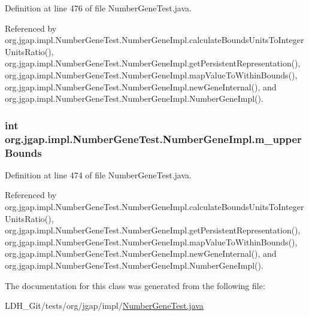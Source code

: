 Definition at line 476 of file Number\-Gene\-Test.\-java.



Referenced by org.\-jgap.\-impl.\-Number\-Gene\-Test.\-Number\-Gene\-Impl.\-calculate\-Bounds\-Units\-To\-Integer\-Units\-Ratio(), org.\-jgap.\-impl.\-Number\-Gene\-Test.\-Number\-Gene\-Impl.\-get\-Persistent\-Representation(), org.\-jgap.\-impl.\-Number\-Gene\-Test.\-Number\-Gene\-Impl.\-map\-Value\-To\-Within\-Bounds(), org.\-jgap.\-impl.\-Number\-Gene\-Test.\-Number\-Gene\-Impl.\-new\-Gene\-Internal(), and org.\-jgap.\-impl.\-Number\-Gene\-Test.\-Number\-Gene\-Impl.\-Number\-Gene\-Impl().

\hypertarget{classorg_1_1jgap_1_1impl_1_1_number_gene_test_1_1_number_gene_impl_aeb2f27970bdd0a0823bb778e4b1a4781}{
\subsubsection[{m\-\_\-upper\-Bounds}]{\setlength{\rightskip}{0pt plus 5cm}int org.\-jgap.\-impl.\-Number\-Gene\-Test.\-Number\-Gene\-Impl.\-m\-\_\-upper\-Bounds\hspace{0.3cm}{\ttfamily [private]}}}\label{classorg_1_1jgap_1_1impl_1_1_number_gene_test_1_1_number_gene_impl_aeb2f27970bdd0a0823bb778e4b1a4781}


Definition at line 474 of file Number\-Gene\-Test.\-java.



Referenced by org.\-jgap.\-impl.\-Number\-Gene\-Test.\-Number\-Gene\-Impl.\-calculate\-Bounds\-Units\-To\-Integer\-Units\-Ratio(), org.\-jgap.\-impl.\-Number\-Gene\-Test.\-Number\-Gene\-Impl.\-get\-Persistent\-Representation(), org.\-jgap.\-impl.\-Number\-Gene\-Test.\-Number\-Gene\-Impl.\-map\-Value\-To\-Within\-Bounds(), org.\-jgap.\-impl.\-Number\-Gene\-Test.\-Number\-Gene\-Impl.\-new\-Gene\-Internal(), and org.\-jgap.\-impl.\-Number\-Gene\-Test.\-Number\-Gene\-Impl.\-Number\-Gene\-Impl().



The documentation for this class was generated from the following file\-:\begin{DoxyCompactItemize}
\item 
L\-D\-H\-\_\-\-Git/tests/org/jgap/impl/\hyperlink{_number_gene_test_8java}{Number\-Gene\-Test.\-java}\end{DoxyCompactItemize}
